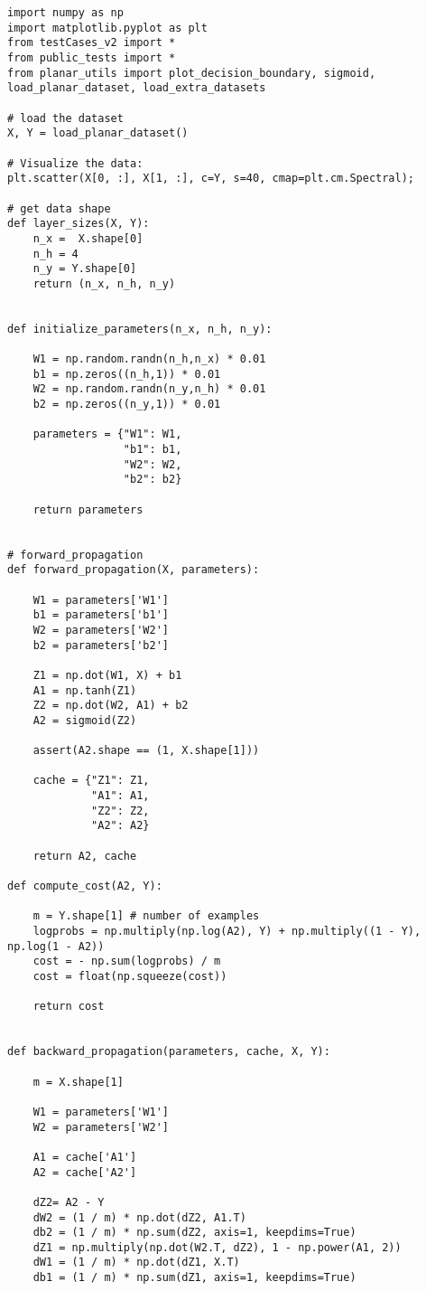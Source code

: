 \documentclass{article}
\begin{document}
\begin{lstlisting}
import numpy as np
import matplotlib.pyplot as plt
from testCases_v2 import *
from public_tests import *
from planar_utils import plot_decision_boundary, sigmoid, load_planar_dataset, load_extra_datasets

# load the dataset
X, Y = load_planar_dataset()

# Visualize the data:
plt.scatter(X[0, :], X[1, :], c=Y, s=40, cmap=plt.cm.Spectral);

# get data shape
def layer_sizes(X, Y):
    n_x =  X.shape[0]
    n_h = 4
    n_y = Y.shape[0]
    return (n_x, n_h, n_y)


def initialize_parameters(n_x, n_h, n_y):

    W1 = np.random.randn(n_h,n_x) * 0.01
    b1 = np.zeros((n_h,1)) * 0.01
    W2 = np.random.randn(n_y,n_h) * 0.01
    b2 = np.zeros((n_y,1)) * 0.01

    parameters = {"W1": W1,
                  "b1": b1,
                  "W2": W2,
                  "b2": b2}

    return parameters


# forward_propagation
def forward_propagation(X, parameters):

    W1 = parameters['W1']
    b1 = parameters['b1']
    W2 = parameters['W2']
    b2 = parameters['b2']

    Z1 = np.dot(W1, X) + b1
    A1 = np.tanh(Z1)
    Z2 = np.dot(W2, A1) + b2
    A2 = sigmoid(Z2)

    assert(A2.shape == (1, X.shape[1]))

    cache = {"Z1": Z1,
             "A1": A1,
             "Z2": Z2,
             "A2": A2}

    return A2, cache

def compute_cost(A2, Y):

    m = Y.shape[1] # number of examples
    logprobs = np.multiply(np.log(A2), Y) + np.multiply((1 - Y), np.log(1 - A2))
    cost = - np.sum(logprobs) / m
    cost = float(np.squeeze(cost))

    return cost


def backward_propagation(parameters, cache, X, Y):

    m = X.shape[1]

    W1 = parameters['W1']
    W2 = parameters['W2']

    A1 = cache['A1']
    A2 = cache['A2']

    dZ2= A2 - Y
    dW2 = (1 / m) * np.dot(dZ2, A1.T)
    db2 = (1 / m) * np.sum(dZ2, axis=1, keepdims=True)
    dZ1 = np.multiply(np.dot(W2.T, dZ2), 1 - np.power(A1, 2))
    dW1 = (1 / m) * np.dot(dZ1, X.T)
    db1 = (1 / m) * np.sum(dZ1, axis=1, keepdims=True)


\end{lstlisting}
\end{document}
